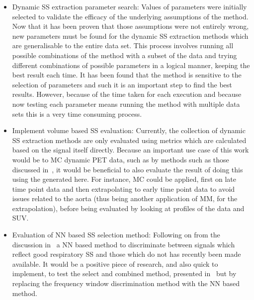             \begin{itemize}
                \item Dynamic \gls{SS} extraction parameter search: Values of parameters were initially selected to validate the efficacy of the underlying assumptions of the method. Now that it has been proven that those assumptions were not entirely wrong, new parameters must be found for the dynamic \gls{SS} extraction methods which are generalisable to the entire data set. This process involves running all possible combinations of the method with a subset of the data and trying different combinations of possible parameters in a logical manner, keeping the best result each time. It has been found that the method is sensitive to the selection of parameters and such it is an important step to find the best results. However, because of the time taken for each execution and because now testing each parameter means running the method with multiple data sets this is a very time consuming process.
    
                \item Implement volume based \gls{SS} evaluation: Currently, the collection of dynamic \gls{SS} extraction methods are only evaluated using metrics which are calculated based on the signal itself directly. Because an important use case of this work would be to \gls{MC} dynamic \gls{PET} data, such as by methods such as those discussed in~, it would be beneficial to also evaluate the result of doing this using the  generated here. For instance, \gls{MC} could be applied, first on late time point data and then extrapolating to early time point data to avoid issues related to the aorta (thus being another application of \gls{MM}, for the extrapolation), before being evaluated by looking at profiles of the data and \gls{SUV}.
    
                \item Evaluation of \gls{NN} based \gls{SS} selection method: Following on from the discussion in~ a \gls{NN} based method to discriminate between signals which reflect good respiratory \gls{SS} and those which do not has recently been made available. It would be a positive piece of research, and also quick to implement, to test the select and combined method, presented in~ but by replacing the frequency window discrimination method with the \gls{NN} based method.
            \end{itemize}
        
